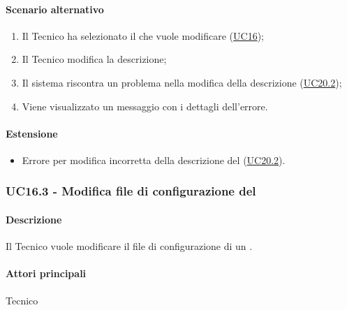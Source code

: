 \paragraph*{Scenario alternativo}
\begin{enumerate}
  \item Il Tecnico ha selezionato il  che vuole modificare (\hyperref[UC16]{UC16});
  \item Il Tecnico modifica la descrizione;
  \item Il sistema riscontra un problema nella modifica della descrizione (\hyperref[UC20point2]{UC20.2});
  \item Viene visualizzato un messaggio con i dettagli dell'errore.
\end{enumerate}

\paragraph{Estensione}
\begin{itemize}
  \item Errore per modifica incorretta della descrizione del  (\hyperref[UC20point2]{UC20.2}).
\end{itemize}


\subsubsection{UC16.3 - Modifica file di configurazione del }\label{UC16point3}
\paragraph*{Descrizione}
Il Tecnico vuole modificare il file di configurazione di un .

\paragraph*{Attori principali}
Tecnico

